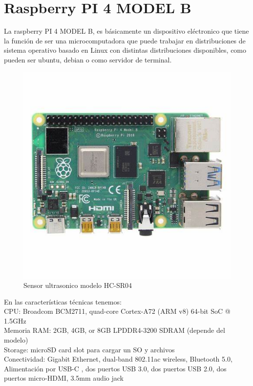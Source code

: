 \documentclass[12pt]{book} %
\begin{document}
	\section{Raspberry PI 4 MODEL B}
La raspberry PI 4 MODEL B, es básicamente un dispositivo eléctronico que tiene la función de ser una microcomputadora que puede trabajar en distribuciones de sistema operativo basado en Linux con distintas distribuciones disponibles, como pueden ser ubuntu, debian o como servidor de terminal.\\
\begin{figure}[H]
	\begin{center}
	\includegraphics[scale = 0.8]{OIP.jpg}
	\caption{Sensor ultrasonico modelo HC-SR04} 
	\end{center}
	\end{figure}
En las características técnicas tenemos:\\
CPU: Broadcom BCM2711, quad-core Cortex-A72 (ARM v8) 64-bit SoC @ 1.5GHz \\
Memoria RAM: 2GB, 4GB, or 8GB LPDDR4-3200 SDRAM (depende del modelo)\\
Storage: microSD card slot para cargar un SO y archivos\\
Conectividad: Gigabit Ethernet, dual-band 802.11ac wireless, Bluetooth 5.0, Alimentación por USB-C , dos puertos USB 3.0, dos puertos USB 2.0, dos puertos micro-HDMI, 3.5mm audio jack\\
\end{document}
